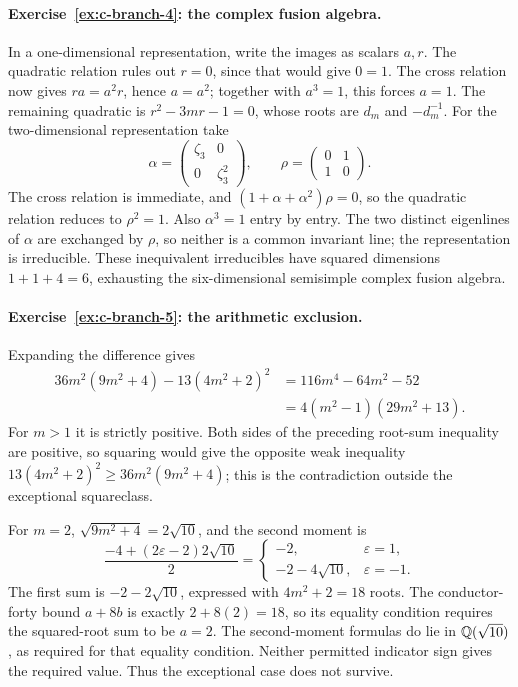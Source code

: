 \paragraph{Exercise~\ref{ex:c-branch-4}: the complex fusion algebra.}
\label{sol:ex:c-branch-4}
In a one-dimensional representation, write the images as scalars
$a,r$. The quadratic relation rules out $r=0$, since that would
give $0=1$. The cross relation now gives $ra=a^2r$, hence
$a=a^2$; together with $a^3=1$, this forces $a=1$.
The remaining quadratic is $r^2-3mr-1=0$, whose roots are
$d_m$ and $-d_m^{-1}$. For the two-dimensional representation take
\[
 \alpha=\begin{pmatrix}\zeta_3&0\\0&\zeta_3^2\end{pmatrix},
 \qquad\rho=\begin{pmatrix}0&1\\1&0\end{pmatrix}.
\]
The cross relation is immediate, and
$(1+\alpha+\alpha^2)\rho=0$, so the quadratic relation reduces to
$\rho^2=1$. Also $\alpha^3=1$ entry by entry. The two distinct
eigenlines of $\alpha$ are exchanged by $\rho$, so neither is a
common invariant line; the representation is irreducible.
These inequivalent irreducibles have squared dimensions
$1+1+4=6$, exhausting the six-dimensional semisimple complex fusion
algebra.



\paragraph{Exercise~\ref{ex:c-branch-5}: the arithmetic exclusion.}
\label{sol:ex:c-branch-5}
Expanding the difference gives
\begin{align*}
 36m^2(9m^2+4)-13(4m^2+2)^2
 &=116m^4-64m^2-52\\
 &=4(m^2-1)(29m^2+13).
\end{align*}
For $m>1$ it is strictly positive. Both sides of the preceding
root-sum inequality are positive, so squaring would give the
opposite weak inequality
$13(4m^2+2)^2\geq36m^2(9m^2+4)$; this is the contradiction outside
the exceptional squareclass.

For $m=2$, $\sqrt{9m^2+4}=2\sqrt{10}$, and the second moment is
\[
 \frac{-4+(2\varepsilon-2)2\sqrt{10}}2
 =\begin{cases}
 -2,&\varepsilon=1,\\
 -2-4\sqrt{10},&\varepsilon=-1.
 \end{cases}
\]
The first sum is $-2-2\sqrt{10}$, expressed with $4m^2+2=18$
roots. The conductor-forty bound $a+8b$ is exactly
$2+8(2)=18$, so its equality condition requires the squared-root
sum to be $a=2$. The second-moment formulas do lie in
$\mathbb Q(\sqrt{10})$, as required for that equality condition.
Neither permitted indicator sign gives the required value.
Thus the exceptional case does not survive.



